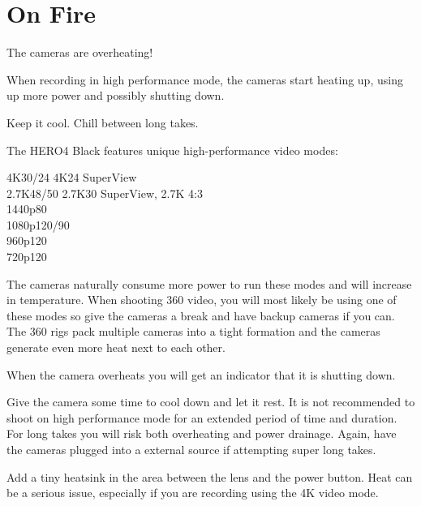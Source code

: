 \section{On Fire}
\pagecolor{white}
\label{chap:19}
\begin{fullwidth}

\problem

{\large The cameras are overheating! \par}

When recording in high performance mode, the cameras start heating up, using up more power and possibly shutting down. 


\solution

{\large Keep it cool. Chill between long takes. \par}

The HERO4 Black features unique high-performance video modes: 

4K30/24 4K24 SuperView
\\
2.7K48/50 2.7K30 SuperView, 2.7K 4:3 
\\
1440p80 
\\
1080p120/90 
\\
960p120 
\\
720p120

The cameras naturally consume more power to run these modes and will increase in temperature. When shooting 360 video, you will most likely be using one of these modes so give the cameras a break and have backup cameras if you can. The 360 rigs pack multiple cameras into a tight formation and the cameras generate even more heat next to each other. 

\clearpage
When the camera overheats you will get an indicator that it is shutting down.

                 
Give the camera some time to cool down and let it rest. It is not recommended to shoot on high performance mode for an extended period of time and duration. For long takes you will risk both overheating and power drainage. Again, have the cameras plugged into a \textbf{} external source if attempting super long takes. 

\tip Add a tiny heatsink in the area between the lens and the power button. Heat can be a serious issue, especially if you are recording using the 4K video mode.






\clearpage
\end{fullwidth}
